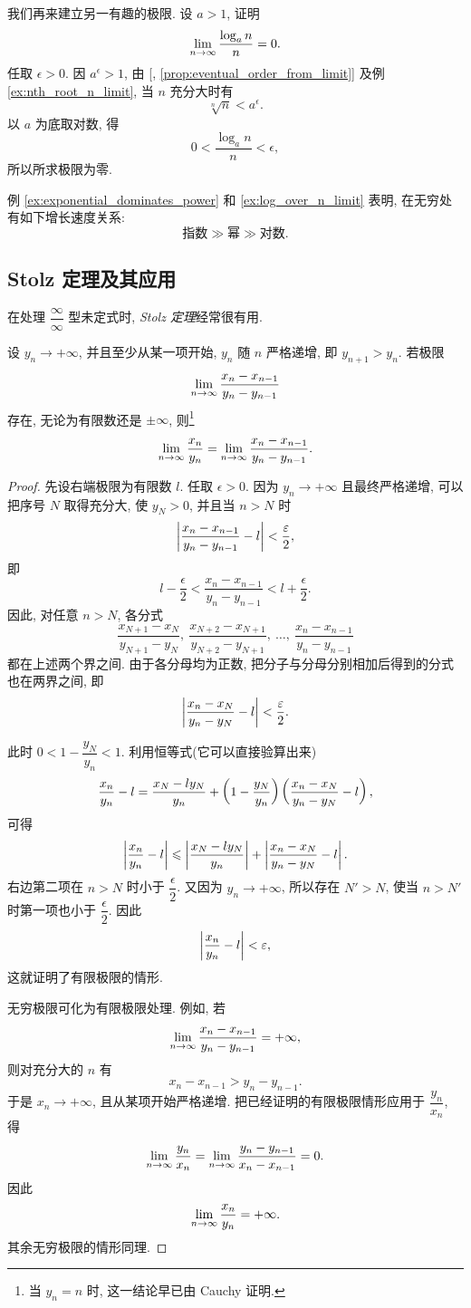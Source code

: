 \label{ex:log_over_n_limit}
我们再来建立另一有趣的极限.
设 $a>1$, 证明
$$
\lim\limits_{n \to \infty}\frac{\log_a n}{n}=0.
$$
任取 $\epsilon>0$. 因 $a^\epsilon>1$, 由 [, \ref{prop:eventual_order_from_limit}]
及例 \ref{ex:nth_root_n_limit}, 当 $n$ 充分大时有
$$
\sqrt[n]{n}<a^\epsilon.
$$
以 $a$ 为底取对数, 得
$$
0<\frac{\log_a n}{n}<\epsilon,
$$
所以所求极限为零.

例 \ref{ex:exponential_dominates_power} 和 \ref{ex:log_over_n_limit} 表明,
在无穷处有如下增长速度关系:
$$
\text{指数}\gg\text{幂}\gg\text{对数}.
$$

\subsection{Stolz 定理及其应用}\label{subsec:33}
在处理 $\dfrac{\infty}{\infty}$ 型未定式时,
\emph{Stolz 定理}经常很有用.

\begin{theorem}[Stolz 定理]\label{thm:stolz}
设 $y_n\to+\infty$, 并且至少从某一项开始, $y_n$ 随 $n$ 严格递增, 即
$y_{n+1}>y_n$. 若极限
$$
\lim\limits_{n \to \infty}\frac{x_n-x_{n-1}}{y_n-y_{n-1}}
$$
存在, 无论为有限数还是 $\pm\infty$, 则\footnote{当 $y_n=n$ 时, 这一结论早已由 Cauchy 证明.}
$$
\lim\limits_{n \to \infty}\frac{x_n}{y_n}
=\lim\limits_{n \to \infty}\frac{x_n-x_{n-1}}{y_n-y_{n-1}}.
$$
\end{theorem}

\begin{proof}
先设右端极限为有限数 $l$. 任取 $\epsilon>0$. 因为 $y_n\to+\infty$ 且最终严格递增,
可以把序号 $N$ 取得充分大, 使 $y_N>0$, 并且当 $n>N$ 时
$$
\left| \frac{x_n-x_{n-1}}{y_n-y_{n-1}}-l \right|<\frac{\varepsilon}{2},
$$
即
$$
l-\frac{\epsilon}{2}
<\frac{x_n-x_{n-1}}{y_n-y_{n-1}}
<l+\frac{\epsilon}{2}.
$$
因此, 对任意 $n>N$, 各分式
$$
\frac{x_{N+1}-x_N}{y_{N+1}-y_N},\
\frac{x_{N+2}-x_{N+1}}{y_{N+2}-y_{N+1}},\ \ldots,\
\frac{x_n-x_{n-1}}{y_n-y_{n-1}}
$$
都在上述两个界之间. 由于各分母均为正数, 把分子与分母分别相加后得到的分式也在两界之间, 即
$$
\left| \frac{x_n-x_N}{y_n-y_N}-l \right|<\frac{\varepsilon}{2}.
$$

此时 $0<1-\dfrac{y_N}{y_n}<1$. 利用恒等式(它可以直接验算出来)
$$
\frac{x_n}{y_n}-l
=\frac{x_N-ly_N}{y_n}
+\left( 1-\frac{y_N}{y_n} \right)
\left( \frac{x_n-x_N}{y_n-y_N}-l \right),
$$
可得
$$
\left| \frac{x_n}{y_n}-l \right|
\leqslant
\left| \frac{x_N-ly_N}{y_n} \right|
+\left| \frac{x_n-x_N}{y_n-y_N}-l \right|.
$$
右边第二项在 $n>N$ 时小于 $\dfrac{\epsilon}{2}$.
又因为 $y_n\to+\infty$, 所以存在 $N'>N$, 使当 $n>N'$ 时第一项也小于
$\dfrac{\epsilon}{2}$. 因此
$$
\left| \frac{x_n}{y_n}-l \right|<\varepsilon,
$$
这就证明了有限极限的情形.

无穷极限可化为有限极限处理. 例如, 若
$$
\lim\limits_{n \to \infty}\frac{x_n-x_{n-1}}{y_n-y_{n-1}}=+\infty,
$$
则对充分大的 $n$ 有
$$
x_n-x_{n-1}>y_n-y_{n-1}.
$$
于是 $x_n\to+\infty$, 且从某项开始严格递增. 把已经证明的有限极限情形应用于
$\dfrac{y_n}{x_n}$, 得
$$
\lim\limits_{n \to \infty}\frac{y_n}{x_n}
=\lim\limits_{n \to \infty}\frac{y_n-y_{n-1}}{x_n-x_{n-1}}
=0.
$$
因此
$$
\lim\limits_{n \to \infty}\frac{x_n}{y_n}=+\infty.
$$
其余无穷极限的情形同理.
\end{proof}

